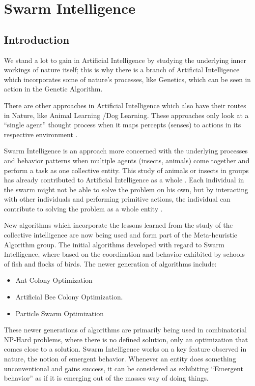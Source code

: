 \chapter{Swarm Intelligence}
\section{Introduction}
We stand a lot to gain in Artificial Intelligence by studying the underlying inner workings of nature itself; this is why there is a branch of Artificial Intelligence which incorporates some of nature’s processes, like Genetics, which can be seen in action in the Genetic Algorithm.

 There are other approaches in Artificial Intelligence which also have their routes in Nature, like Animal Learning /Dog Learning.  These approaches only look at a “single agent” thought process when it maps percepts (senses) to actions in its respective environment \cite{DLearning}. 

Swarm Intelligence is an approach more concerned with the underlying processes and behavior patterns when multiple agents (insects, animals) come together and perform a task as one collective entity.  This study of animals or insects in groups has already contributed to Artificial Intelligence as a whole \cite{ChaoticSwarmIntel,BeeJobShop}. Each individual in the swarm might not be able to solve the problem on his own, but by interacting with other individuals and performing primitive actions, the individual can contribute to solving the problem as a whole entity \cite{BeeJobShop}. 

New algorithms which incorporate the lessons learned from the study of the collective intelligence are now being used and form part of the Meta-heuristic Algorithm group. The initial algorithms developed with regard to Swarm Intelligence, where based on the coordination and behavior exhibited by schools of fish and flocks of birds. The newer generation of algorithms include:
\begin{itemize}
\item Ant Colony Optimization
\item Artificial Bee Colony Optimization.
\item Particle Swarm Optimization 
\end{itemize}

These newer generations of algorithms are primarily being used in combinatorial NP-Hard problems, where there is no defined solution, only an optimization that comes close to a solution. Swarm Intelligence works on a key feature observed in nature, the notion of emergent behavior. Whenever an entity does something unconventional and gains success, it can be considered as exhibiting “Emergent behavior” as if it is emerging out of the masses way of doing things. 

